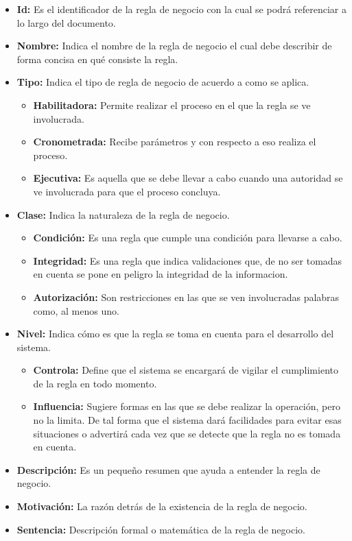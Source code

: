 \begin{itemize}
    \item \textbf{Id:} Es el identificador de la regla de negocio con la cual se podrá referenciar a lo largo del documento.
    \item \textbf{Nombre:} Indica el nombre de la regla de negocio el cual debe describir de forma concisa en qué consiste la regla.
    \item \textbf{Tipo:} Indica el tipo de regla de negocio de acuerdo a como se aplica.
        \begin{itemize}
            \item \textbf{Habilitadora:} Permite realizar el proceso en el que la regla se ve involucrada.
            \item \textbf{Cronometrada:} Recibe parámetros y con respecto a eso realiza el proceso.
            \item \textbf{Ejecutiva:} Es aquella que se debe llevar a cabo cuando una autoridad se ve involucrada para que el proceso concluya.
        \end{itemize}
    \item \textbf{Clase:} Indica la naturaleza de la regla de negocio.
        \begin{itemize}
            \item \textbf{Condición:} Es una regla que cumple una condición para llevarse a cabo.
            \item \textbf{Integridad:} Es una regla que indica validaciones que, de no ser tomadas en cuenta se pone en peligro la integridad de la informacion.
            \item \textbf{Autorización:} Son restricciones en las que se ven involucradas palabras como, al menos uno.
        \end{itemize} 
    \item \textbf{Nivel:} Indica cómo es que la regla se toma en cuenta para el desarrollo del sistema.
        \begin{itemize}
            \item \textbf{Controla:} Define que el sistema se encargará de vigilar el cumplimiento de la regla en todo momento.
            \item \textbf{Influencia:} Sugiere formas en las que se debe realizar la operación, pero no la limita. De tal forma que el sistema dará facilidades para evitar esas situaciones o advertirá cada vez que se detecte que la regla no es tomada en cuenta.
        \end{itemize}
    \item \textbf{Descripción:} Es un pequeño resumen que ayuda a entender la regla de negocio.
    \item \textbf{Motivación:} La razón detrás de la existencia de la regla de negocio.
    \item \textbf{Sentencia:} Descripción formal o matemática de la regla de negocio.
\end{itemize}


